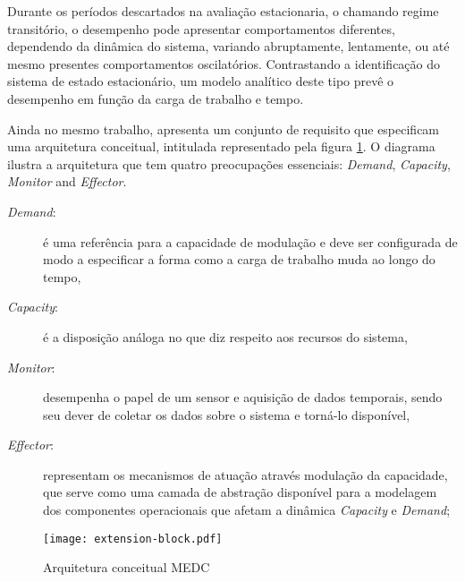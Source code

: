 Durante os períodos descartados na avaliação estacionaria, o chamando regime transitório, o desempenho pode apresentar comportamentos diferentes, dependendo da dinâmica do sistema, variando abruptamente, lentamente, ou até mesmo presentes comportamentos oscilatórios. Contrastando a identificação do sistema de estado estacionário, um modelo analítico deste tipo prevê o desempenho em função da carga de trabalho e tempo.

Ainda no mesmo trabalho, \cite{Lourenco2015} apresenta um conjunto de requisito que especificam uma arquitetura conceitual, intitulada \textit{} representado pela figura \ref{fig:extension-block}. O diagrama ilustra a arquitetura que tem quatro preocupações essenciais: \textit{Demand}, \textit{Capacity}, \textit{Monitor} and \textit{Effector}.

\begin{description}
	\item[\textit{Demand}:] é uma referência para a capacidade de modulação e deve ser configurada de modo a especificar a forma como a carga de trabalho muda ao longo do tempo,
	\item[\textit{Capacity}:]  é a disposição análoga no que diz respeito aos recursos do sistema,
	\item[\textit{Monitor}:] desempenha o papel de um sensor e aquisição de dados temporais, sendo seu dever de coletar os dados sobre o sistema e torná-lo disponível,
	\item[\textit{Effector}:] representam os mecanismos de atuação através modulação da capacidade, que serve como uma camada de abstração disponível para a modelagem dos componentes operacionais que afetam a dinâmica \textit{Capacity} e \textit{Demand};
\end{description}

\begin{figure}[!htb]
	\caption{Arquitetura conceitual MEDC}
	\label{fig:extension-block}
	\centering
	\texttt{[image: extension-block.pdf]}
\end{figure}

